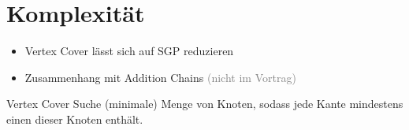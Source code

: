 \section{Komplexität}
	
\begin{frame}{\FrameName}
\begin{itemize}[<+->]
	\item Vertex Cover lässt sich auf SGP reduzieren
	\item Zusammenhang mit Addition Chains \textcolor{gray}{(nicht im Vortrag)}
\end{itemize}
\end{frame}

\begin{frame}{\FrameName}
\begin{block}{Vertex Cover}
	\Gap
	Suche (minimale) Menge von Knoten, sodass jede Kante mindestens einen dieser Knoten enthält.\linebreak
	$ $\linebreak
	
\end{block}
\end{frame}

